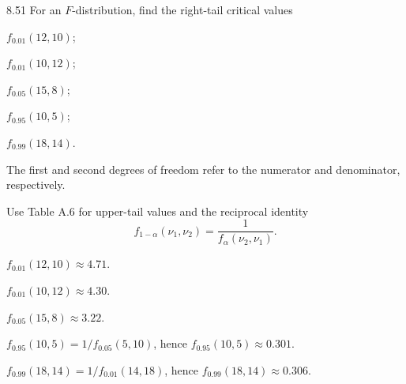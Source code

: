 \documentclass[11pt,oneside]{article}
\begin{document}
\begin{exercise}{8.51}
For an $F$-distribution, find the right-tail critical values
\begin{exercisesubparts}
\item $f_{0.01}(12, 10)$;
\item $f_{0.01}(10, 12)$;
\item $f_{0.05}(15, 8)$;
\item $f_{0.95}(10, 5)$;
\item $f_{0.99}(18, 14)$.
\end{exercisesubparts}
The first and second degrees of freedom refer to the numerator and denominator, respectively.
\end{exercise}
\begin{solution}
Use Table A.6 for upper-tail values and the reciprocal identity
\[
f_{1-\alpha}(\nu_1, \nu_2)=\frac{1}{f_\alpha(\nu_2, \nu_1)}.
\]
\begin{exercisesubparts}
\item $\boxed{f_{0.01}(12, 10)\approx4.71}$.
\item $\boxed{f_{0.01}(10, 12)\approx4.30}$.
\item $\boxed{f_{0.05}(15, 8)\approx3.22}$.
\item $f_{0.95}(10, 5)=1/f_{0.05}(5, 10)$, hence $\boxed{f_{0.95}(10, 5)\approx0.301}$.
\item $f_{0.99}(18, 14)=1/f_{0.01}(14, 18)$, hence $\boxed{f_{0.99}(18, 14)\approx0.306}$.
\end{exercisesubparts}
\end{solution}
\end{document}
